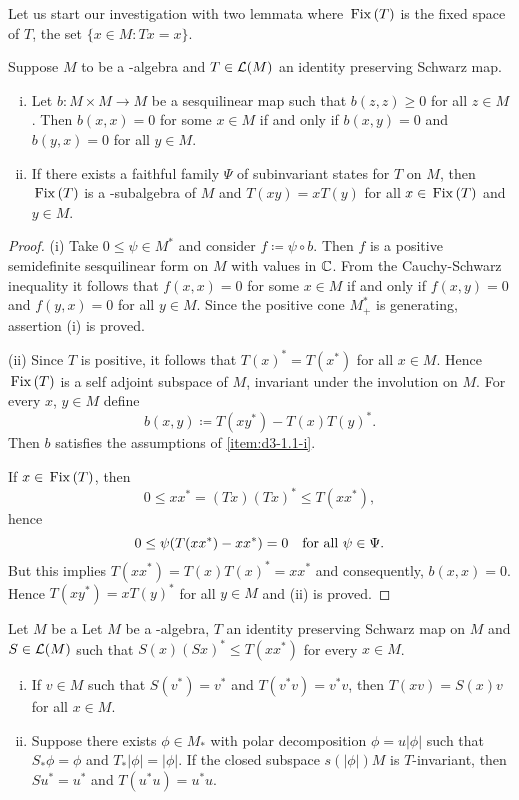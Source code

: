Let us start our investigation with two lemmata where $ \mathop{}\mathrm{Fix}\left(T\right) $ is the fixed space of $T$, \ie the set $ \{x\in M \colon Tx=x \}$.
\begin{lemma}\label{lem:d3-1.1}
Suppose $M$ to be a \CA-algebra and $ T \in \mathcal{L}(M) $ an identity preserving Schwarz map.
\begin{enumerate}[(i)]

\item\label{item:d3-1.1-i}
Let $ b \colon M \times M \to M $ be a sesquilinear map such that $ b(z,z) \geq 0 $ for all $ z \in M $.
Then $ b(x,x) = 0 $ for some $x\in M$ if and only if $b(x,y) = 0$ and $b(y,x) = 0$ for all $y\in M$.

\item\label{item:d3-1.1-ii}
If there exists a faithful family $\Psi$ of subinvariant states for $T$ on $M$, then $\mathop{}\mathrm{Fix}\left(T\right)$ is a \CA-subalgebra of $M$ and $T(xy) = xT(y)$ for all $ x \in \mathop{}\mathrm{Fix}\left(T\right) $ and $ y \in M $.

\end{enumerate}
\end{lemma}
\begin{proof} 
(i) Take $0 \leq \psi \in M^{*}$ and consider $f \coloneqq \psi\circ b$.
Then $f$ is a positive semidefinite sesquilinear form on $M$ with values in $\mathbb{C}$.
From the Cauchy-Schwarz inequality it follows that $f(x,x) = 0$ for some $x\in M$ if and only if $f(x,y) = 0$ and $f(y,x) = 0$ for all $y\in M$.
Since the positive cone $M^{*}_{+}$ is generating, assertion (i) is proved.

(ii) Since $T$ is positive,  it follows that $T(x)^{*} = T(x^{*})$ for all $x \in M$.
Hence $\mathop{}\mathrm{Fix}\left(T\right)$ is a self adjoint subspace of $M$, \ie invariant under the involution on $M$.
For every $x$, $ y \in M $ define
\[
	b(x,y) \coloneqq T(xy^{*}) - T(x)T(y)^{*}.
\]
Then $b$ satisfies the assumptions of \ref{item:d3-1.1-i}.

If $x\in\mathop{}\mathrm{Fix}\left(T\right)$, then
\[
0 \leq xx^{*} = (Tx)(Tx)^{*} \leq T(xx^{*}),
\]
hence
\[
0 \leq \psi(T(xx^{*}) - xx^{*}) = 0 \quad \text{for all $ \psi\in\Psi $.} 
\]
But this implies $T(xx^{*}) = T(x)T(x)^{*} = xx^{*}$ and consequently, $b(x,x) = 0$.
Hence $T(xy^{*}) = xT(y)^{*}$ for all $y\in M$ and (ii) is proved.
\end{proof}
\begin{lemma}\label{lem:d3-1.2}
Let $ M $ be a %
Let $M$ be a \WA-algebra, $T$ an identity preserving Schwarz map on $M$ and $S\in\mathcal{L}(M)$ such that $S(x)(Sx)^{*} \leq T(xx^{*})$ for every $x\in M$.
\begin{enumerate}[(i)]

\item\label{item:d3-1.2-i}
If $v\in M$ such that $S(v^{*}) = v^{*}$ and $T(v^{*}v) = v^{*}v$, then $T(xv) = S(x)v$ for all $x\in M$.

\item\label{item:d3-1.2-ii}
Suppose there exists $\phi\in M_{*}$ with polar decomposition $\phi = u|\phi|$ such that $S_{*}\phi = \phi$ and $T_{*}|\phi| = |\phi|$.
If the closed subspace $s(|\phi|)M$ is $ T $-invariant, then $Su^{*} = u^{*}$ and $T(u^{*}u) = u^{*}u$.
\end{enumerate}
\end{lemma}
